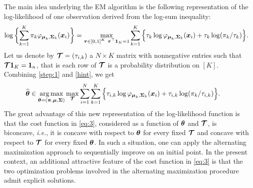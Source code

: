The main idea underlying the EM algorithm is the following representation of the log-likelihood
of one observation derived from the log-sum inequality:
\begin{equation}\label{hint}
\log\bigg\{{\sum_{k=1}^K\pi_k\varphi_{\bmu_{k},\bSigma_{k}}(\bx_i)}\bigg\} =
\max_{\substack{\btau\in[0,1]^K \ \btau^\top \b1_K=1}} \sum_{k=1}^K \Big\{\tau_{k}\log\varphi_{\bmu_{k},\bSigma_{k}}(\bx_i)+\tau_{k} \log(\pi_k/\tau_{k})\Big\}.
\end{equation}
Let us denote by $\boldsymbol{\mathcal T} = (\tau_{i,k})$ a $N\times K$ matrix with nonnegative entries such that $\bTau\b1_K = \b1_n$, that is each
row of $\boldsymbol{\mathcal T}$ is a probability distribution on $[K]$. Combining \eqref{step:1} and \eqref{hint}, we get
\begin{align}\label{eq:3}
\widehat{{\boldsymbol\theta}}
    &\in\operatorname*{arg\,max}_{{\boldsymbol\theta}=(\boldsymbol \pi,\boldsymbol\mu,\boldsymbol\Sigma)}\max_{\boldsymbol{\mathcal T}}
    \sum_{i=1}^{N} \sum_{k=1}^K \Big\{\tau_{i,k}\log\varphi_{\boldsymbol\mu_{k},\boldsymbol\Sigma_{k}}(\boldsymbol x_i)+\tau_{i,k}
    \log(\pi_k/\tau_{i,k})\Big\}.
\end{align}
The great advantage of this new representation of the log-likelihood function is that the cost
function in \eqref{eq:3}, considered as a function of ${\boldsymbol\theta}$ and $\boldsymbol{\mathcal T}$, is biconcave, \textit{i.e.},
it is concave with respect to ${\boldsymbol\theta}$ for every fixed $\boldsymbol{\mathcal T}$ and concave with respect to $\boldsymbol{\mathcal T}$ for
every fixed ${\boldsymbol\theta}$. In such a situation, one can apply the alternating maximization approach to sequentially
improve on an initial point. In the present context, an additional attractive feature of the cost function
in \eqref{eq:3} is that the two optimization problems involved in the alternating maximization procedure
admit explicit solutions.
